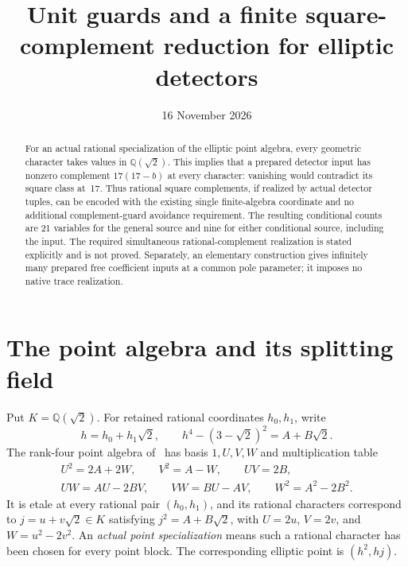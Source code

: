 \documentclass[11pt,a4paper]{article}
\title{Unit guards and a finite square-complement reduction for elliptic detectors}
\author{}\date{16 November 2026}
\theoremstyle{definition}\newtheorem{definition}[theorem]{Definition}
\newcommand{\Q}{\mathbb Q}\newcommand{\Z}{\mathbb Z}
\begin{document}
\maketitle
\begin{abstract}
For an actual rational specialization of the elliptic point algebra,
every geometric character takes values in $\Q(\sqrt2)$. This implies
that a prepared detector input has nonzero complement $17(17-b)$ at
every character: vanishing would contradict its square class at~17.
Thus rational square complements, if realized by actual detector
tuples, can be encoded with the existing single finite-algebra
coordinate and no additional complement-guard avoidance requirement.
The resulting conditional counts are 21 variables for the general
source and nine for either conditional source, including the input.
The required simultaneous rational-complement realization is stated
explicitly and is not proved. Separately, an elementary construction
gives infinitely many prepared free coefficient inputs at a common
pole parameter; it imposes no native trace realization.
\end{abstract}

\section{The point algebra and its splitting field}
Put $K=\Q(\sqrt2)$. For retained rational coordinates $h_0,h_1$, write
\[
h=h_0+h_1\sqrt2,\qquad h^4-(3-\sqrt2)^2=A+B\sqrt2.
\]
The rank-four point algebra of~\cite{Unit} has basis $1,U,V,W$ and
multiplication table
\begin{equation}\label{eq:block}
\begin{gathered}
U^2=2A+2W,\qquad V^2=A-W,\qquad UV=2B,\\
UW=AU-2BV,\qquad VW=BU-AV,\qquad W^2=A^2-2B^2.
\end{gathered}
\end{equation}
It is etale at every rational pair $(h_0,h_1)$, and its rational
characters correspond to $j=u+v\sqrt2\in K$ satisfying
$j^2=A+B\sqrt2$, with $U=2u$, $V=2v$, and $W=u^2-2v^2$.
An \emph{actual point specialization} means such a rational character
has been chosen for every point block. The corresponding elliptic
point is $(h^2,hj)$.
\end{document}
